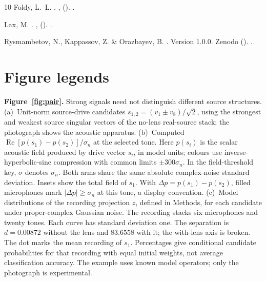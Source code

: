 \documentclass[lineno,pdflatex,sn-nature]{sn-jnl}%
\theoremstyle{thmstyleone}%
\theoremstyle{thmstyletwo}%
\theoremstyle{thmstylethree}%
\begin{document}
\begin{thebibliography}{10}
Foldy, L.~L.
\newblock {}.
\newblock \emph{} \textbf{},  ().
\newblock {}.

Lax, M.
\newblock {}.
\newblock \emph{} \textbf{},  ().
\newblock {}.

Rysmambetov, N., Kappassov, Z. \& Orazbayev, B.
\newblock {}.
\newblock Version 1.0.0. Zenodo ().
\newblock {}.

\end{thebibliography}


\clearpage
\section*{Figure legends}

\noindent\textbf{Figure~\ref{fig:pair}.} Strong signals need not distinguish different source structures. (a)~Unit-norm source-drive candidates $s_{1,2}=(v_1\pm v_8)/\sqrt2$, using the strongest and weakest source singular vectors of the no-lens real-source stack; the photograph shows the acoustic apparatus. (b)~Computed $\operatorname{Re}[p(s_1)-p(s_2)]/\sigma_n$ at the selected tone. Here $p(s_i)$ is the scalar acoustic field produced by drive vector $s_i$, in model units; colours use inverse-hyperbolic-sine compression with common limits $\pm300\sigma_n$. In the field-threshold key, $\sigma$ denotes $\sigma_n$. Both arms share the same absolute complex-noise standard deviation. Insets show the total field of $s_1$. With $\Delta p=p(s_1)-p(s_2)$, filled microphones mark $|\Delta p|\geq\sigma_n$ at this tone, a display convention. (c)~Model distributions of the recording projection $z$, defined in Methods, for each candidate under proper-complex Gaussian noise. The recording stacks six microphones and twenty tones. Each curve has standard deviation one. The separation is $d=0.00872$ without the lens and $83.6558$ with it; the with-lens axis is broken. The dot marks the mean recording of $s_1$. Percentages give conditional candidate probabilities for that recording with equal initial weights, not average classification accuracy. The example uses known model operators; only the photograph is experimental.
\par
\end{document}
